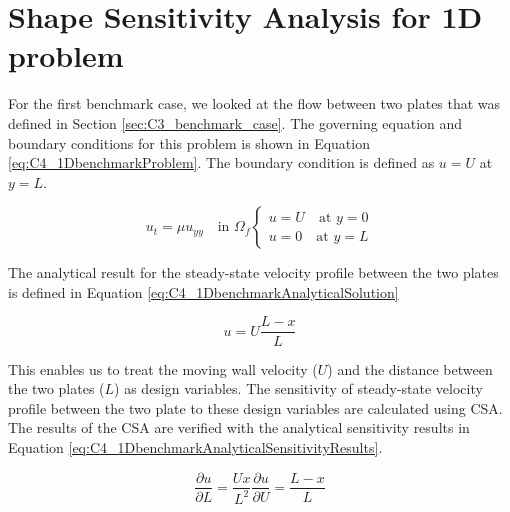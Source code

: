 \section{Shape Sensitivity Analysis for 1D problem}
For the first benchmark case, we looked at the flow between two plates that was defined in Section \ref{sec:C3_benchmark_case}. The governing equation and boundary conditions for this problem is shown in Equation \eqref{eq:C4_1DbenchmarkProblem}. The boundary condition is defined as $u = U$ at $y = L$.

\begin{subequations}\label{eq:C4_1DbenchmarkProblem}
\begin{equation}\label{eq:C4_1DbenchmarkGoverningEquation}
    u_t = \mu u_{yy} \quad \text{in } \Omega_f
\end{equation}
\begin{equation}\label{eq:C4_1DbenchmarkBoundaryCondition}
\begin{cases}
    u = U \quad \text{at } y = 0 \\
    u = 0 \quad \text{at } y = L
\end{cases}
\end{equation}
\end{subequations}

The analytical result for the steady-state velocity profile between the two plates is defined in Equation \eqref{eq:C4_1DbenchmarkAnalyticalSolution}

\begin{equation}\label{eq:C4_1DbenchmarkAnalyticalSolution}
	u = U\frac{L - x}{L}
\end{equation}

This enables us to treat the moving wall velocity ($U$) and the distance between the two plates ($L$) as design variables. The sensitivity of steady-state velocity profile between the two plate to these design variables are calculated using CSA. The results of the CSA are verified with the analytical sensitivity results in Equation \eqref{eq:C4_1DbenchmarkAnalyticalSensitivityResults}.

\begin{subequations}\label{eq:C4_1DbenchmarkAnalyticalSensitivityResults}
\begin{equation}\label{eq:C4_1DbenchmarkAnalyticalSAlength}
	\frac{\partial u}{\partial L} = \frac{Ux}{L^2}
\end{equation}
\begin{equation}\label{eq:C4_1DbenchmarkAnalyticalSAvelocity}
	\frac{\partial u}{\partial U} = \frac{L - x}{L}
\end{equation}
\end{subequations}

